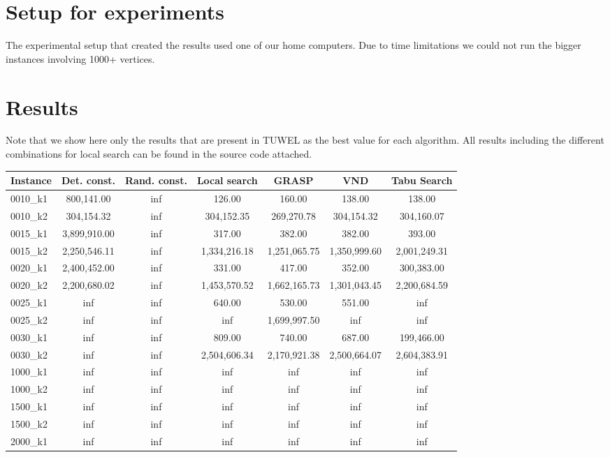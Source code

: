 \documentclass{article}
\begin{document}
\section*{Setup for experiments}
The experimental setup that created the results used one of our home computers. Due to time limitations we could not run the bigger instances involving 1000+ vertices.
\section*{Results}
Note that we show here only the results that are present in TUWEL as the best value for each algorithm. All results including the different combinations for local search can be found in the source code attached.
\small
\begin{center}
\begin{tabular}{|l|c|c|c|c|c|c|}
\hline
Instance & Det. const. & Rand. const. & Local search & GRASP & VND & Tabu Search \\
\hline
0010\_k1 & 800,141.00 & inf & 126.00 & 160.00 & 138.00 & 138.00 \\
0010\_k2 & 304,154.32 & inf & 304,152.35 & 269,270.78 & 304,154.32 & 304,160.07 \\
0015\_k1 & 3,899,910.00 & inf & 317.00 & 382.00 & 382.00 & 393.00 \\
0015\_k2 & 2,250,546.11 & inf & 1,334,216.18 & 1,251,065.75 & 1,350,999.60 & 2,001,249.31 \\
0020\_k1 & 2,400,452.00 & inf & 331.00 & 417.00 & 352.00 & 300,383.00 \\
0020\_k2 & 2,200,680.02 & inf & 1,453,570.52 & 1,662,165.73 & 1,301,043.45 & 2,200,684.59 \\
0025\_k1 & inf & inf & 640.00 & 530.00 & 551.00 & inf \\
0025\_k2 & inf & inf & inf & 1,699,997.50 & inf & inf \\
0030\_k1 & inf & inf & 809.00 & 740.00 & 687.00 & 199,466.00 \\
0030\_k2 & inf & inf & 2,504,606.34 & 2,170,921.38 & 2,500,664.07 & 2,604,383.91 \\
1000\_k1 & inf & inf & inf & inf & inf & inf \\
1000\_k2 & inf & inf & inf & inf & inf & inf \\
1500\_k1 & inf & inf & inf & inf & inf & inf \\
1500\_k2 & inf & inf & inf & inf & inf & inf \\
2000\_k1 & inf & inf & inf & inf & inf & inf \\

\end{tabular}
\end{center}
\end{document}
